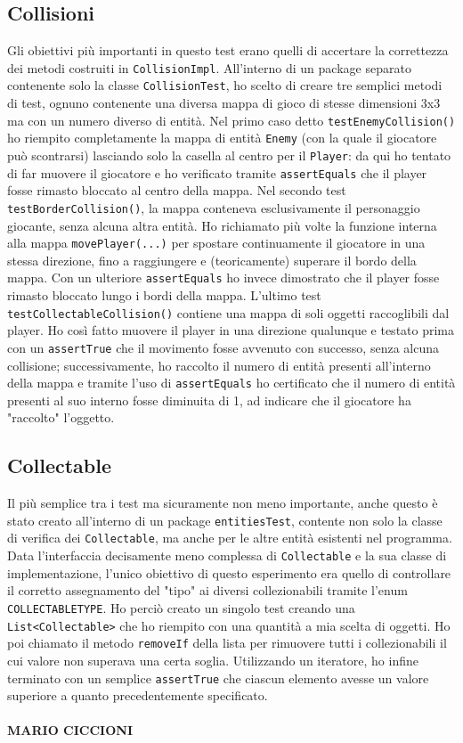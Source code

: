 \documentclass[a4paper,12pt]{report}
\begin{document}
\subsection{Collisioni}
Gli obiettivi più importanti in questo test erano quelli di accertare la correttezza dei metodi costruiti in \verb|CollisionImpl|. All'interno di un package separato contenente solo la classe \verb|CollisionTest|, ho scelto di creare tre semplici metodi di test, ognuno contenente una diversa mappa di gioco di stesse dimensioni 3x3 ma con un numero diverso di entità. Nel primo caso detto \verb|testEnemyCollision()| ho riempito completamente la mappa di entità \verb|Enemy| (con la quale il giocatore può scontrarsi) lasciando solo la casella al centro per il \verb|Player|: da qui ho tentato di far muovere il giocatore e ho verificato tramite \verb|assertEquals| che il player fosse rimasto bloccato al centro della mappa.
Nel secondo test \verb|testBorderCollision()|, la mappa conteneva esclusivamente il personaggio giocante, senza alcuna altra entità.
Ho richiamato più volte la funzione interna alla mappa \verb|movePlayer(...)| per spostare continuamente il giocatore in una stessa direzione, fino a raggiungere e (teoricamente) superare il bordo della mappa. Con un ulteriore \verb|assertEquals| ho invece dimostrato che il player fosse rimasto bloccato lungo i bordi della mappa.
L'ultimo test \verb|testCollectableCollision()| contiene una mappa di soli oggetti raccoglibili dal player. Ho così fatto muovere il player in una direzione qualunque e testato prima con un \verb|assertTrue| che il movimento fosse avvenuto con successo, senza alcuna collisione; successivamente, ho raccolto il numero di entità presenti all'interno della mappa e tramite l'uso di \verb|assertEquals| ho certificato che il numero di entità presenti al suo interno fosse diminuita di 1, ad indicare che il giocatore ha "raccolto" l'oggetto.
\subsection{Collectable}
Il più semplice tra i test ma sicuramente non meno importante, anche questo è stato creato all'interno di un package \verb|entitiesTest|, contente non solo la classe di verifica dei \verb|Collectable|, ma anche per le altre entità esistenti nel programma. Data l'interfaccia decisamente meno complessa di \verb|Collectable| e la sua classe di implementazione, l'unico obiettivo di questo esperimento era quello di controllare il corretto assegnamento del "tipo" ai diversi collezionabili tramite l'enum \verb|COLLECTABLETYPE|. Ho perciò creato un singolo test creando una \verb|List<Collectable>| che ho riempito con una quantità a mia scelta di oggetti. Ho poi chiamato il metodo \verb|removeIf| della lista per rimuovere tutti i collezionabili il cui valore non superava una certa soglia. Utilizzando un iteratore, ho infine terminato con un semplice \verb|assertTrue| che ciascun elemento avesse un valore superiore a quanto precedentemente specificato.
\\ \\
\textbf{MARIO CICCIONI}
\end{document}

